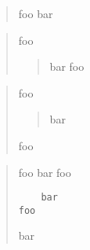 \begin{quote}
foo
bar
\end{quote}

\begin{quote}
foo

\begin{quote}
bar
foo
\end{quote}
\end{quote}

\begin{quote}
foo

\begin{quote}
bar
\end{quote}

foo
\end{quote}

\begin{quote}
foo
bar
 foo

\begin{verbatim}
	bar
foo
\end{verbatim}

bar
\end{quote}
